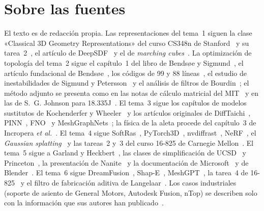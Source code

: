 \documentclass[11pt,a4paper,twoside,openany]{book}
\begin{document}
\section*{Sobre las fuentes}
El texto es de redacción propia. Las representaciones del tema~1 siguen la clase «Classical 3D Geometry Representations» del curso CS348n de Stanford~\cite{cs348n} y su tarea~2~\cite{cs348nhw2}, el artículo de DeepSDF~\cite{deepsdf} y el de \emph{marching cubes}~\cite{mc}. La optimización de topología del tema~2 sigue el capítulo~1 del libro de Bendsøe y Sigmund~\cite{bs}, el artículo fundacional de Bendsøe~\cite{bendsoe89}, los códigos de 99 y 88 líneas~\cite{sigmund99,andreassen}, el estudio de inestabilidades de Sigmund y Petersson~\cite{sigpet} y el análisis de filtros de Bourdin~\cite{bourdin}; el método adjunto se presenta como en las notas de cálculo matricial del MIT~\cite{mit18s096} y en las de S.~G. Johnson para 18.335J~\cite{johnson}. El tema~3 sigue los capítulos de modelos sustitutos de Kochenderfer y Wheeler~\cite{kw} y los artículos originales de DiffTaichi~\cite{difftaichi}, PINN~\cite{pinn}, FNO~\cite{fno} y MeshGraphNets~\cite{mgn}; la física de la aleta procede del capítulo~3 de Incropera \emph{et al.}~\cite{incropera}. El tema~4 sigue SoftRas~\cite{softras}, PyTorch3D~\cite{pytorch3d}, nvdiffrast~\cite{nvdiffrast}, NeRF~\cite{nerf}, el \emph{Gaussian splatting}~\cite{gs} y las tareas~2 y~3 del curso 16-825 de Carnegie Mellon~\cite{cmu16825}. El tema~5 sigue a Garland y Heckbert~\cite{garland}, las clases de simplificación de UCSD~\cite{ucsd190} y Princeton~\cite{cos526}, la presentación de Nanite~\cite{nanite} y la documentación de Microsoft~\cite{msbc} y de Blender~\cite{blenderapi}. El tema~6 sigue DreamFusion~\cite{dreamfusion}, Shap-E~\cite{shape}, MeshGPT~\cite{meshgpt}, la tarea~4 de 16-825~\cite{cmu16825} y el filtro de fabricación aditiva de Langelaar~\cite{langelaar}. Los casos industriales (soporte de asiento de General Motors, Autodesk Fusion, nTop) se describen solo con la información que sus autores han publicado~\cite{gmautodesk,fusiongd,ntop}.
\end{document}
